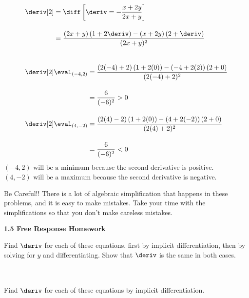 \begin{tcolorbox}[solution]
\begin{align*}
        & \deriv[2] \begin{aligned}[t]
            & = \diff \left[\deriv = -\dfrac{x + 2y}{2x + y}\right] \\[11pt]
            & = \dfrac{(2x + y)\left(1 + 2\deriv\right) - (x + 2y)\left(2 + \deriv\right)}{(2x + y)^2} \\[11pt]
        \end{aligned} \\[11pt]
        & \deriv[2] \eval_{(-4, 2)} \begin{aligned}[t]
            & = \dfrac{(2(-4) + 2)\left(1 + 2(0)\right) - (-4 + 2(2))\left(2 + 0\right)}{(2(-4) + 2)^2} \\[11pt]
            & = \dfrac{6}{(-6)^2} > 0
        \end{aligned} \\[11pt]
        & \deriv[2] \eval_{(4, -2)} \begin{aligned}[t]
            & = \dfrac{(2(4) - 2)\left(1 + 2(0)\right) - (4 + 2(-2))\left(2 + 0\right)}{(2(4) + 2)^2} \\[11pt]
            & = \dfrac{6}{(-6)^2} < 0
        \end{aligned}
    \end{align*}
    $\boxed{(-4, 2) \text{ will be a minimum}}$ because the second derivative is positive. \\[11pt]
    $\boxed{(4, -2) \text{ will be a maximum}}$ because the second derivative is negative.
\end{tcolorbox}

Be Careful!! There is a lot of algebraic simplification that happens in these problems, and it is easy to make mistakes. Take your time with the simplifications so that you don't make careless mistakes. \par

\newpage

\textbf{\large{1.5 Free Response Homework}} \par

Find $\deriv$ for each of these equations, first by implicit differentiation, then by solving for $y$ and differentiating. Show that $\deriv$ is the same in both cases. \par

 \\[11pt]
 \\[11pt]

Find $\deriv$ for each of these equations by implicit differentiation. \par


